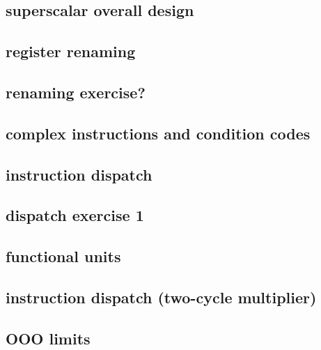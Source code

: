 \subsection{superscalar overall design}


\subsection{register renaming}



\subsection{renaming exercise?}



\subsection{complex instructions and condition codes}


\subsection{instruction dispatch}


\subsection{dispatch exercise 1}


\subsection{functional units}


\subsection{instruction dispatch (two-cycle multiplier)}



\subsection{OOO limits}


